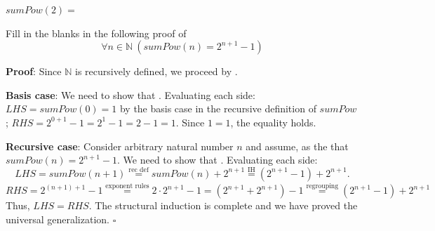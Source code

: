 \documentclass[12pt, oneside]{article}
\begin{document}
$sumPow(2) =$

\vspace{20pt}


Fill in the blanks in the following proof of 
\[
    \forall n \in \mathbb{N}~(sumPow(n) = 2^{n+1} - 1)
\]

{\bf Proof}: Since $\mathbb{N}$ is recursively defined, we proceed by \underline{}.

{\bf Basis case}: We need to show that \underline{}.
Evaluating each side: $LHS = sumPow(0) = 1$ by the basis case in the recursive definition
of $sumPow$; $RHS = 2^{0+1} - 1 = 2^1 - 1 = 2-1 = 1$. Since $1=1$, the equality holds.

{\bf Recursive case}: Consider arbitrary natural number $n$ and assume, as the 
\underline{\phantom{Induction Hypothesis (IH)}} that $sumPow(n) = 2^{n+1} - 1$. We need to show that
\underline{}.  Evaluating each side: 
\[
LHS = sumPow(n+1) \overset{\text{rec def}}{=} sumPow(n)  + 2^{n+1}\overset{\text{IH}}{=} (2^{n+1} - 1) + 2^{n+1}.
\]
\[
RHS = 2^{(n+1)+1}- 1 \overset{\text{exponent rules}}{=} 2 \cdot 2^{n+1} -1  = \left(2^{n+1} + 2^{n+1} \right) - 1
\overset{\text{regrouping}}{=}  (2^{n+1} - 1) + 2^{n+1} 
\]
Thus, $LHS = RHS$. The structural induction is complete and we have proved the universal generalization.
$\square$

 \newpage


 
\end{document}
